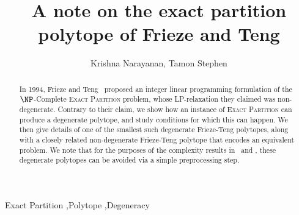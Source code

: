 \documentclass[3p, twocolumn]{elsarticle}
\begin{document}
\begin{frontmatter}


\title{A note on the exact partition polytope of Frieze and Teng}


\author{Krishna Narayanan, Tamon Stephen} %


\begin{abstract}
In 1994, Frieze and Teng~\cite{FT94} proposed an integer linear programming formulation of the $\NP$-Complete \textsc{Exact Partition} problem, whose LP-relaxation they claimed was non-degenerate. Contrary to their claim, we show how an instance of \textsc{Exact Partition} can produce a degenerate polytope, and study conditions for which this can happen. We then give details of one of the smallest such degenerate Frieze-Teng polytopes, along with a closely related non-degenerate Frieze-Teng polytope that encodes an equivalent problem. We note that for the purposes of the complexity results in~\cite{FT94} and \cite{NS26}, these degenerate polytopes can be avoided via a simple preprocessing step. 

\end{abstract}



\begin{keyword}
Exact Partition \sep Polytope \sep Degeneracy 



\end{keyword}

\end{frontmatter}
\end{document}
